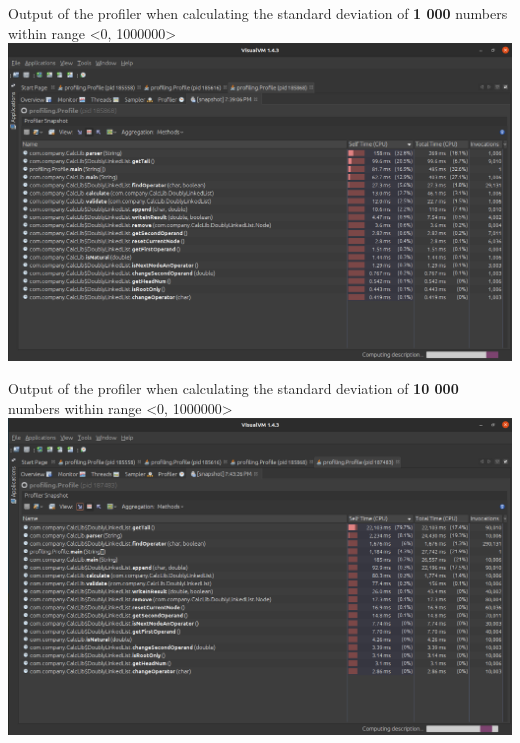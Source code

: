 \documentclass{article}
\begin{document}
\begin{landscape}
\begin{center}
      \newpage

      \Large{Output of the profiler when calculating the standard deviation of \textbf{1 000} numbers within range \textless 0, 1000000\textgreater}\\
      \vspace{1cm}
      \includegraphics[width=26cm]{profiling_result-1000_numbers.eps}

      \newpage

      \Large{Output of the profiler when calculating the standard deviation of \textbf{10 000} numbers within range \textless 0, 1000000\textgreater}\\
      \vspace{1cm}
      \includegraphics[width=26cm]{profiling_result-10000_numbers.eps}

    \end{center}
  \end{landscape}
\end{document}
